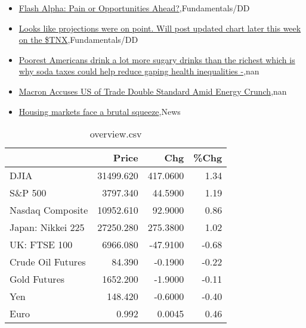 \documentclass{article}%
\begin{document}
%
\begin{itemize}%
\item%
\href{https://reddit.com/r/StockMarket/comments/yd3ht5/flash\_alpha\_pain\_or\_opportunities\_ahead/}{Flash Alpha: Pain or Opportunities Ahead?},Fundamentals/DD%
\item%
\href{https://reddit.com/r/StockMarket/comments/yd333y/looks\_like\_projections\_were\_on\_point\_will\_post/}{Looks like projections were on point. Will post updated chart later this week on the \$TNX},Fundamentals/DD%
\item%
\href{https://reddit.com/r/Economics/comments/yd42xm/poorest\_americans\_drink\_a\_lot\_more\_sugary\_drinks/}{Poorest Americans drink a lot more sugary drinks than the richest  which is why soda taxes could help reduce gaping health inequalities -},nan%
\item%
\href{https://reddit.com/r/Economics/comments/yd37p9/macron\_accuses\_us\_of\_trade\_double\_standard\_amid/}{Macron Accuses US of Trade Double Standard Amid Energy Crunch},nan%
\item%
\href{https://reddit.com/r/Economics/comments/yd0big/housing\_markets\_face\_a\_brutal\_squeeze/}{Housing markets face a brutal squeeze},News%
\end{itemize}%


\begin{table}[htbp]%
\caption{overview.csv}%
\centering%
\begin{adjustbox}{width=1\textwidth}%
\begin{tabular}{lrrr}
\toprule
                  &     Price &      Chg &  \%Chg \\
\midrule
             DJIA & 31499.620 & 417.0600 &  1.34 \\
          S\&P 500 &  3797.340 &  44.5900 &  1.19 \\
 Nasdaq Composite & 10952.610 &  92.9000 &  0.86 \\
Japan: Nikkei 225 & 27250.280 & 275.3800 &  1.02 \\
     UK: FTSE 100 &  6966.080 & -47.9100 & -0.68 \\
Crude Oil Futures &    84.390 &  -0.1900 & -0.22 \\
     Gold Futures &  1652.200 &  -1.9000 & -0.11 \\
              Yen &   148.420 &  -0.6000 & -0.40 \\
             Euro &     0.992 &   0.0045 &  0.46 \\
\bottomrule
\end{tabular}
%
\end{adjustbox}%
\end{table}
\end{document}
